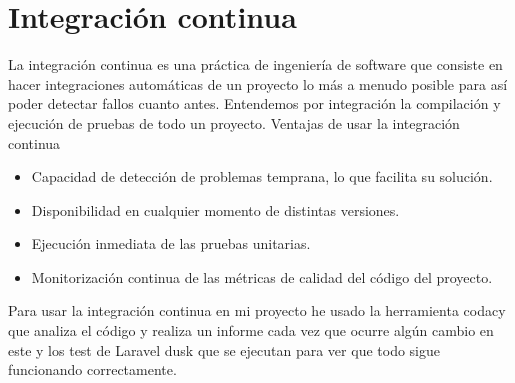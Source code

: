 \section{Integración continua}
La integración continua es una práctica de ingeniería de software que consiste en hacer integraciones automáticas de un proyecto lo más a menudo posible para así poder detectar fallos cuanto antes. Entendemos por integración la compilación y ejecución de pruebas de todo un proyecto.\cite{IntegracionContinua}
Ventajas de usar la integración continua 
\begin{itemize}
    \item Capacidad de detección de problemas temprana, lo que facilita su solución.
    \item Disponibilidad en cualquier momento de distintas versiones.
    \item Ejecución inmediata de las pruebas unitarias.
    \item Monitorización continua de las métricas de calidad del código del proyecto.
\end{itemize}
Para usar la integración continua en mi proyecto he usado la herramienta codacy que analiza el código y realiza un informe cada vez que ocurre algún cambio en este y los test de Laravel dusk que se ejecutan para ver que todo sigue funcionando correctamente.\\


 